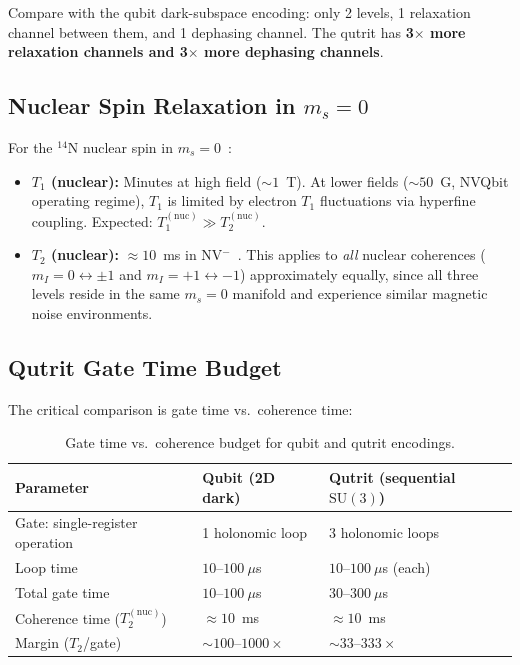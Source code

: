 \documentclass[11pt,letterpaper]{article}
\newcommand{\SU}{\mathrm{SU}}
\begin{document}
Compare with the qubit dark-subspace encoding: only 2 levels, 1 relaxation channel
between them, and 1 dephasing channel. The qutrit has \textbf{3$\times$ more relaxation
channels and 3$\times$ more dephasing channels}.

\subsection{Nuclear Spin Relaxation in $m_s = 0$}

For the $^{14}$N nuclear spin in $m_s = 0$~\cite{Pfender2017}:
\begin{itemize}
  \item \textbf{$T_1$ (nuclear):} Minutes at high field ($\sim 1$~T). At lower fields
    ($\sim 50$~G, NVQbit operating regime), $T_1$ is limited by electron $T_1$
    fluctuations via hyperfine coupling. Expected: $T_1^{(\text{nuc})} \gg T_2^{(\text{nuc})}$.
  \item \textbf{$T_2$ (nuclear):} $\approx 10$~ms in NV$^-$~\cite{Pfender2017}. %
    This applies to \emph{all} nuclear coherences ($m_I = 0 \leftrightarrow \pm 1$ and
    $m_I = +1 \leftrightarrow -1$) approximately equally, since all three levels reside
    in the same $m_s = 0$ manifold and experience similar magnetic noise environments.
\end{itemize}

\subsection{Qutrit Gate Time Budget}

The critical comparison is gate time vs.\ coherence time:

\begin{table}[h]
\centering
\caption{Gate time vs.\ coherence budget for qubit and qutrit encodings.}
\label{tab:decoherence}
\begin{tabular}{@{}lll@{}}
\toprule
\textbf{Parameter} & \textbf{Qubit (2D dark)} & \textbf{Qutrit (sequential $\SU(3)$)} \\
\midrule
Gate: single-register operation & 1 holonomic loop & 3 holonomic loops \\
Loop time & $10$--$100~\mu$s & $10$--$100~\mu$s (each) \\
Total gate time & $10$--$100~\mu$s & $30$--$300~\mu$s \\
Coherence time ($T_2^{(\text{nuc})}$) & $\approx 10$~ms & $\approx 10$~ms \\ %
Margin ($T_2$/gate) & $\sim 100\text{--}1000\times$ & $\sim 33\text{--}333\times$ \\
\bottomrule
\end{tabular}
\end{table}
\end{document}
